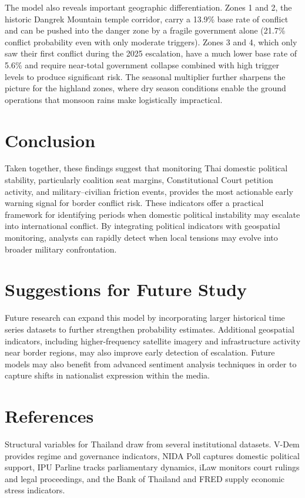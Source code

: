 \documentclass[12pt]{article}
\begin{document}
The model also reveals important geographic differentiation. Zones 1 and 2, the historic Dangrek Mountain temple corridor, carry a 13.9\% base rate of conflict and can be pushed into the danger zone by a fragile government alone (21.7\% conflict probability even with only moderate triggers). Zones 3 and 4, which only saw their first conflict during the 2025 escalation, have a much lower base rate of 5.6\% and require near-total government collapse combined with high trigger levels to produce significant risk. The seasonal multiplier further sharpens the picture for the highland zones, where dry season conditions enable the ground operations that monsoon rains make logistically impractical.

\section*{Conclusion}

Taken together, these findings suggest that monitoring Thai domestic political stability, particularly coalition seat margins, Constitutional Court petition activity, and military--civilian friction events, provides the most actionable early warning signal for border conflict risk. These indicators offer a practical framework for identifying periods when domestic political instability may escalate into international conflict. By integrating political indicators with geospatial monitoring, analysts can rapidly detect when local tensions may evolve into broader military confrontation.

\section*{Suggestions for Future Study}

Future research can expand this model by incorporating larger historical time series datasets to further strengthen probability estimates. Additional geospatial indicators, including higher-frequency satellite imagery and infrastructure activity near border regions, may also improve early detection of escalation. Future models may also benefit from advanced sentiment analysis techniques in order to capture shifts in nationalist expression within the media.

\section*{References}

Structural variables for Thailand draw from several institutional datasets. V-Dem provides regime and governance indicators, NIDA Poll captures domestic political support, IPU Parline tracks parliamentary dynamics, iLaw monitors court rulings and legal proceedings, and the Bank of Thailand and FRED supply economic stress indicators.
\end{document}
